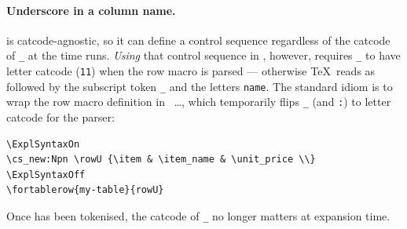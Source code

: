 \documentclass{ltxdoc}
\begin{document}
\begin{description}
        \paragraph{Underscore in a column name.}
         is catcode-agnostic, so it can define a control sequence  regardless of the catcode of \texttt{\_} at the time \cmd{\fortablerow} runs.
        \emph{Using} that control sequence in , however, requires \texttt{\_} to have letter catcode (\texttt{11}) when the row macro is parsed --- otherwise \TeX\ reads  as \cmd{\item} followed by the subscript token \texttt{\_} and the letters \texttt{name}.
        The standard idiom is to wrap the row macro definition in \cmd{\ExplSyntaxOn}~\dots\cmd{\ExplSyntaxOff}, which temporarily flips \texttt{\_} (and \texttt{:}) to letter catcode for the parser:
        \begin{verbatim}
\ExplSyntaxOn
\cs_new:Npn \rowU {\item & \item_name & \unit_price \\}
\ExplSyntaxOff
\fortablerow{my-table}{rowU}\end{verbatim}
        Once \cmd{\rowU} has been tokenised, the catcode of \texttt{\_} no longer matters at expansion time.

    \end{description}

    \clearpage
    \addtolength\textwidth{2cm}%
    \setlength\linewidth{\textwidth}%
    \addtolength\oddsidemargin{-2cm}%
    \addtolength\evensidemargin{-1cm}%

    \printbibliography[heading=bibnumbered]
\end{document}
